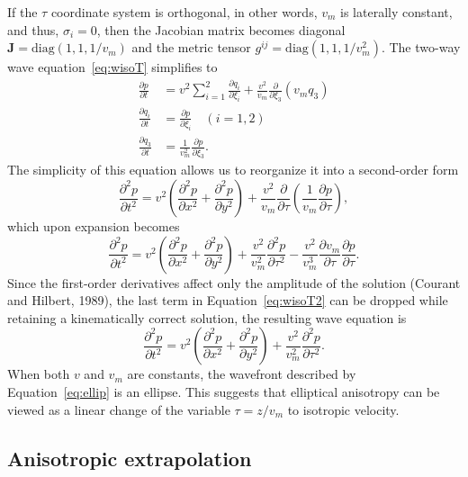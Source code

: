 If the $\tau$ coordinate system is orthogonal, in other words, $v_m$ is laterally constant, and thus, $\sigma_i = 0$, then the Jacobian matrix becomes diagonal $\mathbf{J} = \mathrm{diag}(1,1,1/v_m)$ and the metric tensor $g^{ij} = \mathrm{diag}(1,1,1/v_m^2)$. The two-way wave equation~\ref{eq:wisoT} simplifies to
\begin{align}
\frac{\partial p}{\partial t} & = v^2 \sum_{i=1}^2\frac{\partial q_i}{\partial \xi_i} + \frac{v^2}{v_m}\frac{\partial}{\partial \xi_3}\left(v_m q_3\right) \nonumber \\
\frac{\partial q_i}{\partial t} & = \frac{\partial p}{\partial \xi_i} \quad (i=1,2) \\
\frac{\partial q_3}{\partial t} & = \frac{1}{v_m^2} \frac{\partial p}{\partial \xi_3} \nonumber . 
\end{align}
The simplicity of this equation allows us to reorganize it into a second-order form
\begin{equation}
\frac{\partial^2 p}{\partial t^2} = v^2 \left(\frac{\partial^2 p}{\partial x^2} + \frac{\partial^2 p}{\partial y^2}\right) + \frac{v^2}{v_m} \frac{\partial}{\partial \tau} \left(\frac{1}{v_m} \frac{\partial p}{\partial \tau}\right) ,
\end{equation}
which upon expansion becomes
\begin{equation}\label{eq:wisoT2}
\frac{\partial^2 p}{\partial t^2} = v^2 \left(\frac{\partial^2 p}{\partial x^2} + \frac{\partial^2 p}{\partial y^2}\right) + \frac{v^2}{v_m^2} \frac{\partial^2 p}{\partial \tau^2} - \frac{v^2}{v_m^3} \frac{\partial v_m}{\partial \tau} \frac{\partial p}{\partial \tau} .
\end{equation}
Since the first-order derivatives affect only the amplitude of the solution (Courant and Hilbert, 1989), the last term in Equation~\ref{eq:wisoT2} can be dropped while retaining a kinematically correct solution, the resulting wave equation is
\begin{equation}
\label{eq:ellip}
\frac{\partial^2 p}{\partial t^2} = v^2 \left(\frac{\partial^2 p}{\partial x^2} + \frac{\partial^2 p}{\partial y^2}\right) + \frac{v^2}{v_m^2} \frac{\partial^2 p}{\partial \tau^2} .
\end{equation}
When both $v$ and $v_m$ are constants, the wavefront described by Equation~\ref{eq:ellip} is an ellipse. This suggests that elliptical anisotropy can be viewed as a linear change of the variable $\tau = z / v_m$ to isotropic velocity.

\subsection{Anisotropic extrapolation}

